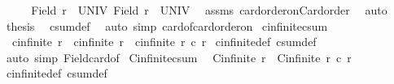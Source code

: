 \begin{isabellebody}
%
\isadelimproof
%
\endisadelimproof
%
\isatagproof
{}\isamarkupfalse%
\ {\isacharminus}{\kern0pt}\isanewline
\ \ \isamarkupfalse%
\ {\isachardoublequoteopen}Field\ r{}\ {\isacharequal}{\kern0pt}\ UNIV{\isachardoublequoteclose}\ {\isachardoublequoteopen}Field\ r{}\ {\isacharequal}{\kern0pt}\ UNIV{\isachardoublequoteclose}\ \isamarkupfalse%
\ assms\ card{\isacharunderscore}{\kern0pt}order{\isacharunderscore}{\kern0pt}on{\isacharunderscore}{\kern0pt}Card{\isacharunderscore}{\kern0pt}order\ \isamarkupfalse%
\ auto\isanewline
\ \ \isamarkupfalse%
\ {\isacharquery}{\kern0pt}thesis\ \isamarkupfalse%
\ csum{\isacharunderscore}{\kern0pt}def\ \isamarkupfalse%
\ {\isacharparenleft}{\kern0pt}auto\ simp{\isacharcolon}{\kern0pt}\ card{\isacharunderscore}{\kern0pt}of{\isacharunderscore}{\kern0pt}card{\isacharunderscore}{\kern0pt}order{\isacharunderscore}{\kern0pt}on{\isacharparenright}{\kern0pt}\isanewline
{}\isamarkupfalse%
%
\endisatagproof
{\isafoldproof}%
%
\isadelimproof
\isanewline
%
\endisadelimproof
\isanewline
{}\isamarkupfalse%
\ cinfinite{\isacharunderscore}{\kern0pt}csum{\isacharcolon}{\kern0pt}\isanewline
\ \ {\isachardoublequoteopen}cinfinite\ r{}\ {\isasymor}\ cinfinite\ r{}\ {\isasymLongrightarrow}\ cinfinite\ {\isacharparenleft}{\kern0pt}r{}\ {\isacharplus}{\kern0pt}c\ r{}{\isacharparenright}{\kern0pt}{\isachardoublequoteclose}\isanewline
%
\isadelimproof
%
\endisadelimproof
%
\isatagproof
{}\isamarkupfalse%
\ cinfinite{\isacharunderscore}{\kern0pt}def\ csum{\isacharunderscore}{\kern0pt}def\ \isamarkupfalse%
\ {\isacharparenleft}{\kern0pt}auto\ simp{\isacharcolon}{\kern0pt}\ Field{\isacharunderscore}{\kern0pt}card{\isacharunderscore}{\kern0pt}of{\isacharparenright}{\kern0pt}%
\endisatagproof
{\isafoldproof}%
%
\isadelimproof
\isanewline
%
\endisadelimproof
\isanewline
{}\isamarkupfalse%
\ Cinfinite{\isacharunderscore}{\kern0pt}csum{}{\isacharcolon}{\kern0pt}\isanewline
\ \ {\isachardoublequoteopen}Cinfinite\ r{}\ {\isasymLongrightarrow}\ Cinfinite\ {\isacharparenleft}{\kern0pt}r{}\ {\isacharplus}{\kern0pt}c\ r{}{\isacharparenright}{\kern0pt}{\isachardoublequoteclose}\isanewline
%
\isadelimproof
%
\endisadelimproof
%
\isatagproof
{}\isamarkupfalse%
\ cinfinite{\isacharunderscore}{\kern0pt}def\ csum{\isacharunderscore}{\kern0pt}def\ \isamarkupfalse%

\end{isabellebody}
